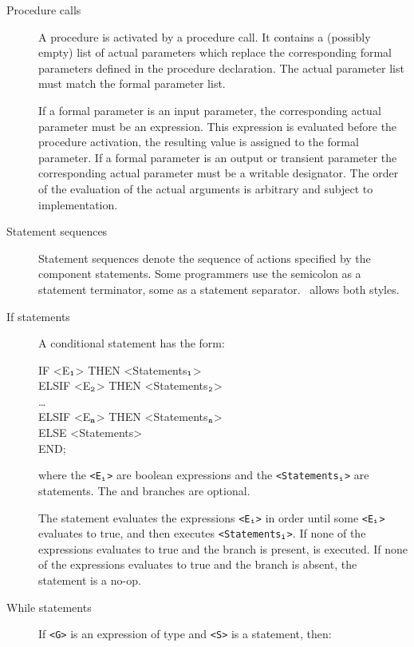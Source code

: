 \begin{description}
\item[Procedure calls] A procedure is activated by a procedure
call. It contains a (possibly empty) list of actual parameters which
replace the corresponding formal parameters defined in the procedure
declaration. The actual parameter list must match the formal parameter
list.

If a formal parameter is an input parameter, the corresponding actual
parameter must be an expression.  This expression is evaluated before
the procedure activation, the resulting value is assigned to the
formal parameter. If a formal parameter is an output or transient
parameter the corresponding actual parameter must be a writable
designator. The order of the evaluation of the actual arguments is
arbitrary and subject to implementation.

\item[Statement sequences] Statement sequences denote the sequence of
actions specified by the component statements. Some programmers use
the semicolon as a statement terminator, some as a statement
separator. \Booster\ allows both styles.

\item[If statements] A conditional statement has the form:

\begin{frag}
IF <E$_{\tt 1}$> THEN <Statements$_{\tt 1}$>\\
\>ELSIF <E$_{\tt 2}$> THEN <Statements$_{\tt 2}$>\\
\>\ldots\\
\>ELSIF <E$_{\tt n}$> THEN <Statements$_{\tt n}$>\\
\>ELSE <Statements>\\
END;
\end{frag}

\noindent where the {\tt <E$_{\tt i}$>} are boolean expressions and
the {\tt <Statements$_{\tt i}$>} are statements. The  and  branches
are optional.

The statement evaluates the expressions {\tt <E$_{\tt i}$>} in order
until some {\tt <E$_{\tt i}$>} evaluates to {\sf true}, and then
executes {\tt <Statements$_{\tt i}$>}. If none of the expressions
evaluates to {\sf true} and the branch  is
present,  is executed. If none of the expressions
evaluates to {\sf true} and the branch  is
absent, the statement is a no-op.

\item[While statements] If {\tt <G>} is an expression of type 
and {\tt <S>} is a statement, then:


\end{description}
